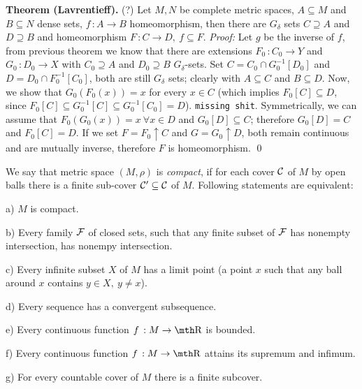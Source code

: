\medskip
{\bf Theorem (Lavrentieff).} (?) Let $M,N$ be complete metric spaces, 
$A\subseteq M$ and $B\subseteq N$ dense sets, $f\,:A\to B$ homeomorphism, then 
there are $G_\delta$ sets $C\supseteq A$ and $D\supseteq B$ and homeomorphism 
$F\,: C\to D,\ f\subseteq F$.
\smallskip
{\it Proof:} Let $g$ be the inverse of $f$, from previous theorem we know that 
there are extensions $F_0\,:C_0\to Y$ and $G_0\,:D_0\to X$ with $C_0\supseteq 
A$ and $D_0 \supseteq B$ $G_\delta$-sets. Set $C = C_0\cap G_0^{-1}[D_0]$ and 
$D = D_0 \cap F_0^{-1}[C_0]$, both are still $G_\delta$ sets; clearly with 
$A\subseteq C$ and $B\subseteq D$. Now, we show that $G_0(F_0(x)) = x$ for every 
$x\in C$ (which implies $F_0[C]\subseteq D$, since $F_0[C] \subseteq G_0^{-1} 
[C] \subseteq G_0^{-1}[C_0] = D$). {\tt missing shit}. Symmetrically, we can 
assume that $F_0(G_0(x)) = x\ \forall x\in D$ and $G_0[D]\subseteq C$; therefore 
$G_0[D] = C$ and $F_0[C]=D$. If we set $F=F_0\uparrow C$ and $G=G_0\uparrow D$, 
both remain continuous and are mutually inverse, therefore $F$ is homeomorphism.
\qed
\medskip


 We say that metric space $(M,\rho)$ is {\it compact}, if for 
each cover $\cal C$ of $M$ by open balls there is a finite sub-cover $\cal 
C'\subseteq C$ of $M$. Following statements are equivalent:
{\parindent0.5in\parskip6pt
	\item{a)} $M$ is compact.
	\item{b)} Every family $\cal F$ of closed sets, such that any finite 
		subset of $\cal F$ has nonempty intersection, has nonempy intersection.
	\item{c)} Every infinite subset $X$ of $M$ has a limit point (a point 
		$x$ such that any ball around $x$ contains $y\in X,\ y\neq x$).
	\item{d)} Every sequence has a convergent subsequence.
	\item{e)} Every continuous function $f\,:M\to \R$ is bounded.
	\item{f)} Every continuous function $f\,:M\to \R$ attains its supremum and 
		infimum.
	\item{g)} For every countable cover of $M$ there is a finite subcover.

}

